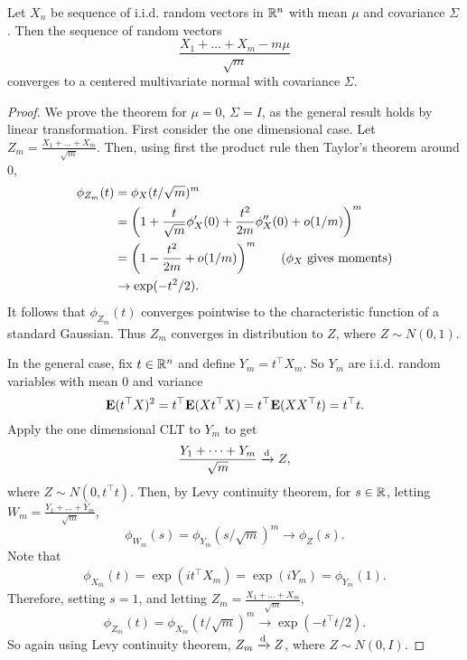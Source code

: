 \documentclass{article}
\begin{document}
\begin{thm}
    Let $X_n$ be sequence of i.i.d. random vectors in $\mathbb{R}^n $ with mean $\mu $ and covariance $\Sigma $. Then the sequence of random vectors 
    \[
        \frac{X_1 +\dots  + X_m - m \mu}{\sqrt{m}} 
    \]
    converges to a centered multivariate normal with covariance $\Sigma $. 
\end{thm}
\begin{proof}
    We prove the theorem for $\mu  = 0$, $\Sigma = I$, as the general result holds by linear transformation. First consider the one dimensional case. Let $Z_m = \frac{X_1 +\dots +X_m }{\sqrt{m} }$. Then, using first the product rule then Taylor's theorem around $0$, 
    \begin{align*}
        \phi _{Z_m } (t) &=  \phi _{X} (t/\sqrt{m} )^m \\
        &= \parens*{1 + \frac{t}{\sqrt{m} }\phi_X '(0) + \frac{t^2 }{2m}\phi''_X (0) + o(1/m)}^m  \\
        &= \parens*{1 - \frac{t^2 }{2m} + o(1/m)}^m \tag{$\phi _X $ gives moments}\\
        &\to \exp (-t^2 /2) . 
    \end{align*}
    It follows that $\phi_{Z_m }(t)$ converges pointwise to the characteristic function of a standard Gaussian. Thus $Z_m $ converges in distribution to $Z$, where $Z \sim N(0, 1)$. 

    In the general case, fix $t \in \mathbb{R}^n $ and define $Y_m = t^{\top} X_m $. So $Y_m $ are i.i.d. random variables with mean $0$ and variance 
    \[
        \mathbf{E} (t^{\top} X )^2  = t^{\top} \mathbf{E} (X t^{\top} X ) = t^{\top} \mathbf{E} (X X ^{\top} t) = t^{\top} t. 
    \]
    Apply the one dimensional CLT to $Y_m $ to get 
    \[
        \frac{Y_1 + \dots + Y_m }{\sqrt{m} } \xrightarrow{\text{d}} Z,
    \]
    where $Z \sim N(0, t^{\top} t)$. Then, by Levy continuity theorem, for $s \in \mathbb{R} $, letting $W_m = \frac{Y_1 +\dots +Y_m }{\sqrt{m} }$,
    \[
        \phi _{W_m }(s) = \phi _{Y_m }(s/\sqrt{m} )^m \to \phi _Z (s). 
    \]
    Note that 
    \begin{align*}
        \phi_{X_m }(t) = \exp (it^{\top} X_m) = \exp (iY_m ) = \phi_{Y_m }(1).  
    \end{align*}
    Therefore, setting $s = 1$, and letting $Z_m = \frac{X_1 +\dots +X_m }{\sqrt{m} }$, 
    \[
        \phi _{Z_m }(t) = \phi _{X_m }(t/\sqrt{m} )^m \to \exp (-t^{\top} t/2). 
    \]
    So again using Levy continuity theorem, $Z_m \xrightarrow{\text{d}} Z$, where $Z \sim N(0, I)$. 

\end{proof}
\end{document}
